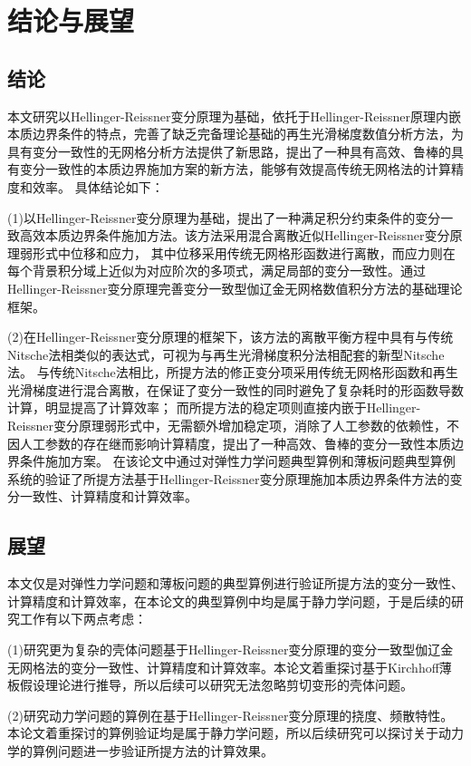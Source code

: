 \chapter{结论与展望}
\section{结论}
本文研究以Hellinger-Reissner变分原理为基础，依托于Hellinger-Reissner原理内嵌本质边界条件的特点，完善了缺乏完备理论基础的再生光滑梯度数值分析方法，为具有变分一致性的无网格分析方法提供了新思路，提出了一种具有高效、鲁棒的具有变分一致性的本质边界施加方案的新方法，能够有效提高传统无网格法的计算精度和效率。
具体结论如下：
\par
(1)以Hellinger-Reissner变分原理为基础，提出了一种满足积分约束条件的变分一致高效本质边界条件施加方法。该方法采用混合离散近似Hellinger-Reissner变分原理弱形式中位移和应力，
其中位移采用传统无网格形函数进行离散，而应力则在每个背景积分域上近似为对应阶次的多项式，满足局部的变分一致性。通过Hellinger-Reissner变分原理完善变分一致型伽辽金无网格数值积分方法的基础理论框架。
\par
(2)在Hellinger-Reissner变分原理的框架下，该方法的离散平衡方程中具有与传统Nitsche法相类似的表达式，可视为与再生光滑梯度积分法相配套的新型Nitsche法。
与传统Nitsche法相比，所提方法的修正变分项采用传统无网格形函数和再生光滑梯度进行混合离散，在保证了变分一致性的同时避免了复杂耗时的形函数导数计算，明显提高了计算效率；
而所提方法的稳定项则直接内嵌于Hellinger-Reissner变分原理弱形式中，无需额外增加稳定项，消除了人工参数的依赖性，不因人工参数的存在继而影响计算精度，提出了一种高效、鲁棒的变分一致性本质边界条件施加方案。
在该论文中通过对弹性力学问题典型算例和薄板问题典型算例系统的验证了所提方法基于Hellinger-Reissner变分原理施加本质边界条件方法的变分一致性、计算精度和计算效率。
\section{展望}
本文仅是对弹性力学问题和薄板问题的典型算例进行验证所提方法的变分一致性、计算精度和计算效率，在本论文的典型算例中均是属于静力学问题，于是后续的研究工作有以下两点考虑：\par
(1)研究更为复杂的壳体问题基于Hellinger-Reissner变分原理的变分一致型伽辽金无网格法的变分一致性、计算精度和计算效率。本论文着重探讨基于Kirchhoff薄板假设理论进行推导，所以后续可以研究无法忽略剪切变形的壳体问题。\par
(2)研究动力学问题的算例在基于Hellinger-Reissner变分原理的挠度、频散特性。本论文着重探讨的算例验证均是属于静力学问题，所以后续研究可以探讨关于动力学的算例问题进一步验证所提方法的计算效果。
